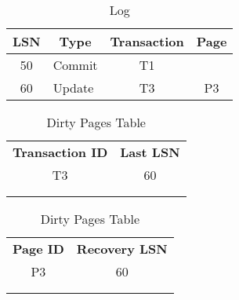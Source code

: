 \begin{table}[H]
\centering
\begin{tabular}{|c|l|c|c|}
\hline
\textbf{LSN}           & \multicolumn{1}{c|}{\textbf{Type}} & \textbf{Transaction}  & \textbf{Page}         \\ \hline
50                     & Commit                             & T1                    &                       \\ \hline
60                     & Update                             & T3                    & P3                    \\ \hline
\end{tabular}
\caption{Log}
\end{table}

\begin{table}[H]
    \begin{minipage}{.5\linewidth}
      \centering
		\begin{tabular}{|c|c|}
		\cline{1-2}
		\textbf{Transaction ID} & \textbf{Last LSN} \\ \cline{1-2}
		T3             & 60       \\ \cline{1-2}
		               &          \\ \cline{1-2}
		               &          \\ \cline{1-2}
		\end{tabular}
      \caption{Active Transactions Table}

    \end{minipage}%
    \begin{minipage}{.5\linewidth}
      \centering
		\begin{tabular}{|c|c|}
		\cline{1-2}
		\textbf{Page ID} & \textbf{Recovery LSN} \\ \cline{1-2}
		P3      & 60           \\ \cline{1-2}
		        &              \\ \cline{1-2}
		        &              \\ \cline{1-2}
		\end{tabular}
        \caption{Dirty Pages Table}

    \end{minipage} 
\end{table}
